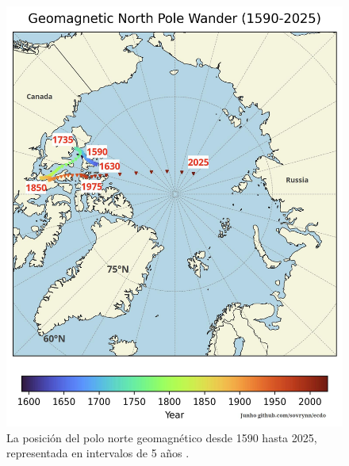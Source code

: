 \documentclass[10pt,twocolumn,letterpaper]{article}
\begin{document}
\begin{figure}[t]
\begin{center}
   \includegraphics[width=1\linewidth]{npw.jpg}
\end{center}
   \caption{La posición del polo norte geomagnético desde 1590 hasta 2025, representada en intervalos de 5 años \cite{142}.}
\label{fig:13}
\label{fig:onecol}
\end{figure}
\end{document}

